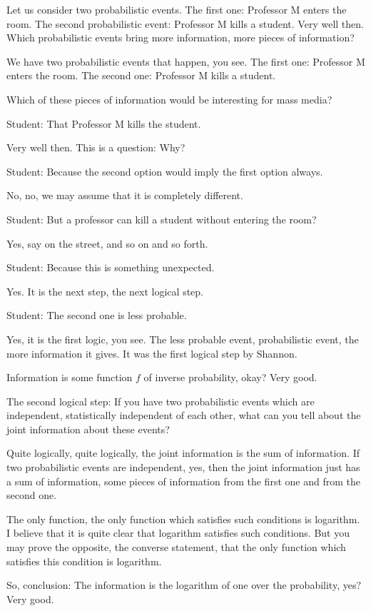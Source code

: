 \documentclass{article}
\begin{document}
Let us consider two probabilistic events. The first one: Professor M enters the room. The second probabilistic event: Professor M kills a student. Very well then. Which probabilistic events bring more information, more pieces of information?

We have two probabilistic events that happen, you see. The first one: Professor M enters the room. The second one: Professor M kills a student.

Which of these pieces of information would be interesting for mass media?

Student: That Professor M kills the student.

Very well then. This is a question: Why?

Student: Because the second option would imply the first option always.

No, no, we may assume that it is completely different.

Student: But a professor can kill a student without entering the room?

Yes, say on the street, and so on and so forth.

Student: Because this is something unexpected.

Yes. It is the next step, the next logical step.

Student: The second one is less probable.

Yes, it is the first logic, you see. The less probable event, probabilistic event, the more information it gives. It was the first logical step by Shannon.

Information is some function $f$ of inverse probability, okay? Very good.

The second logical step: If you have two probabilistic events which are independent, statistically independent of each other, what can you tell about the joint information about these events?

Quite logically, quite logically, the joint information is the sum of information. If two probabilistic events are independent, yes, then the joint information just has a sum of information, some pieces of information from the first one and from the second one.

The only function, the only function which satisfies such conditions is logarithm. I believe that it is quite clear that logarithm satisfies such conditions. But you may prove the opposite, the converse statement, that the only function which satisfies this condition is logarithm.

So, conclusion: The information is the logarithm of one over the probability, yes? Very good.
\end{document}
